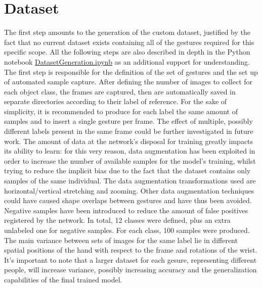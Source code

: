 \documentclass[10pt,twocolumn,letterpaper]{article}
\begin{document}
\section{Dataset}
\begin{flushleft}
The first step amounts to the generation of the custom dataset, justified by the fact that no current dataset exists containing all of the gestures required for this specific scope.
All the following steps are also described in depth in the Python notebook \href{https://github.com/MarzioVallero/ML-Based-Blender-Gestural-Input-Interface/blob/master/DatasetGeneration.ipynb}{DatasetGeneration.ipynb} as an additional support for understanding.\linebreak
The first step is responsible for the definition of the set of gestures and the set up of automated sample capture. After defining the number of images to collect for each object class, the frames are captured, then are automatically saved in separate directories according to their label of reference. For the sake of simplicity, it is recommended to produce for each label the same amount of samples and to insert a single gesture per frame. The effect of multiple, possibly different labels present in the same frame could be further investigated in future work.\linebreak
The amount of data at the network's disposal for training greatly impacts its ability to learn: for this very reason, data augmentation has been exploited in order to increase the number of available samples for the model's training, whilst trying to reduce the implicit bias due to the fact that the dataset contains only samples of the same individual. The data augmentation transformations used are horizontal/vertical stretching and zooming. Other data augmentation techniques could have caused shape overlaps between gestures and have thus been avoided. Negative samples have been introduced to reduce the amount of false positives registered by the network.\linebreak
In total, 12 classes were defined, plus an extra unlabeled one for negative samples. For each class, 100 samples were produced.\linebreak
The main variance between sets of images for the same label lie in different spatial positions of the hand with respect to the frame and rotations of the wrist.\linebreak
It's important to note that a larger dataset for each gesure, representing different people, will increase variance, possibly increasing accuracy and the generalization capabilities of the final trained model.


\end{flushleft}
\end{document}

